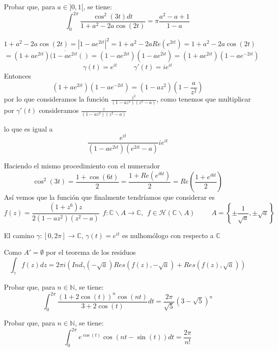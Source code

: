\begin{ejer}
	Probar que, para $a\in]0,1[$, se tiene:
	$$ \int_0^{2\pi} \frac{\cos^2(3t)dt}{1+a^2-2a\cos(2t)} = \pi\frac{a^2-a+1}{1-a} $$
\end{ejer}

\begin{sol}

$$1+a^2-2a\cos(2 t) = |1-ae^{2it}|^2 = 1+a^2-2aRe(e^{2it}) =  1+a^2-2a\cos(2t)$$
$$ = (1+ae^{2it})(\overline{1-ae^{2it}}()
= (1-ae^{2it})(1-a\overline{e^{2it}}) = (1+ae^{2it})(1-ae^{-2it})$$
$$\gamma(t) = e^{it} \hspace{1cm} \gamma'(t) = ie^{it}$$
Entonces
$$(1+ae^{2it})(1-ae^{-2it}) = (1-az^2)(1-\frac{a}{z^2})$$
por lo que consideramos la función $\frac{z^2}{(1-az^2)(z^2-a)}$, 
como tenemos que multiplicar por $\gamma'(t)$ consideramos $\frac{z}{(1-az^2)(z^2-a)}$

lo que es igual a
$$\frac{e^{it}}{(1-ae^{2it})(e^{2it}-a)} ie^{it}$$

Haciendo el mismo procedimiento con el numerador
$$\cos^2(3t) = \frac{1+\cos(6t)}{2} = \frac{1+Re(e^{i6t})}{2} = Re(\frac{1+e^{i6t}}{2})$$
Así vemos que la función que finalmente tendríamos que considerar es
$$f(z) = \frac{(1+z^6)z}{2(1-az^2)(z^2-a)} \ \ f:\mathbb{C}\backslash A \rightarrow \mathbb{C}, \ \ f\in\mathcal{H}(\mathbb{C}\backslash A) \hspace{1cm} A = \left\{ \pm\frac{1}{\sqrt{a}}, \pm\sqrt{a} \right\}$$

El camino $\gamma:[0,2\pi] \rightarrow \mathbb{C}$, $\gamma(t) = e^{it}$ es nulhomólogo con respecto a $\mathbb{C}$

Como $A' = \emptyset$ por el teorema de los residuos
$$\int_{\gamma} f(z)dz = 2\pi i \left( Ind_{\gamma}(-\sqrt{a})Res(f(z),-\sqrt{a}) + Res(f(z), \sqrt{a}) \right)$$
\end{sol}

\begin{ejer}
	Probar que, para $n\in\mathbb{N}$, se tiene:
	$$ \int_0^{2\pi} \frac{(1+2\cos(t))^n \cos(nt)}{3+2\cos(t)} dt = \frac{2\pi}{\sqrt{5}} (3-\sqrt{5})^n $$
\end{ejer}


\begin{ejer}
	Probar que, para $n\in\mathbb{N}$, se tiene:
	$$ \int_{0}^{2\pi} e^{\cos(t)} \cos(nt-\sin(t))dt = \frac{2\pi}{n!} $$
\end{ejer}


